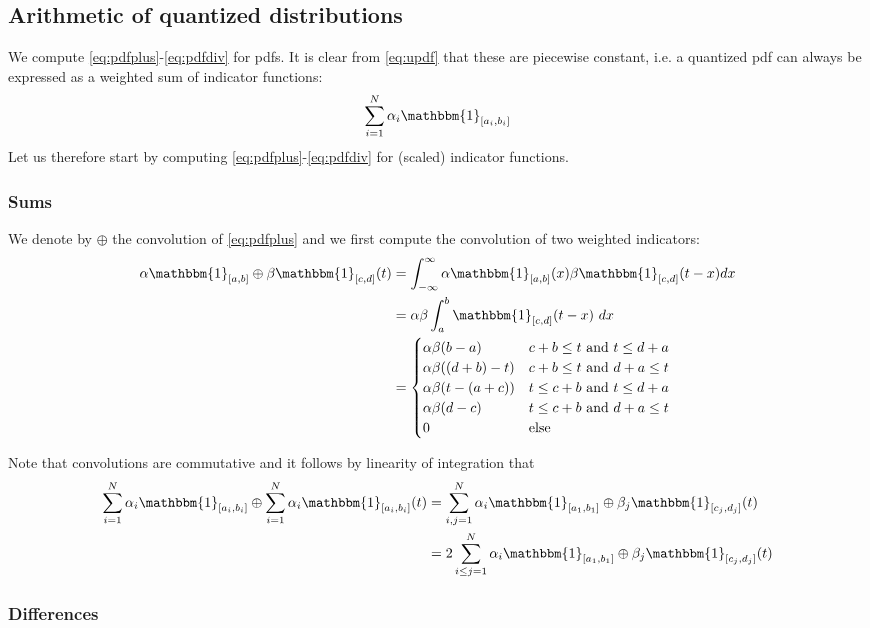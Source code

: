 \documentclass[10pt,a4paper]{article}
\theoremstyle{plain}
\theoremstyle{definition}
\newcommand{\one}{\mathbbm{1}}
\begin{document}
\subsection{Arithmetic of quantized distributions}

We compute \eqref{eq:pdfplus}-\eqref{eq:pdfdiv} for pdfs. It is clear from \eqref{eq:updf} that these are piecewise constant, i.e. a quantized pdf can always be expressed as a weighted sum of indicator functions:
\[
\sum_{i=1}^N \alpha_i \one_{\left[a_i,b_i\right]}
\]
Let us therefore start by computing \eqref{eq:pdfplus}-\eqref{eq:pdfdiv} for (scaled) indicator functions.

\subsubsection{Sums}
We denote by $\oplus$ the convolution of \eqref{eq:pdfplus} and we first compute the convolution of two weighted indicators:
\begin{align*}
\alpha\one_{[a,b]}\oplus\beta\one_{[c,d]}(t)& =\int_{-\infty}^\infty\alpha\one_{[a,b]}(x)\beta\one_{[c,d]}(t-x)dx \\
&=\alpha\beta\int_a^b \one_{[c,d]}(t-x)~dx\\
&= \begin{cases}
\alpha\beta(b-a)&c+b\leq t\text{ and }t\leq d+a\\
\alpha\beta((d+b)-t) & c+b\leq t\text{ and } d+a\leq t \\
\alpha\beta(t-(a+c)) & t\leq c+b\text{ and }t\leq d+a\\
\alpha\beta(d-c) & t\leq c+b\text{ and } d+a\leq t\\
0 &\text{else}
\end{cases}
\end{align*}

Note that convolutions are commutative and it follows by linearity of integration that
\begin{align*}
\sum_{i=1}^N \alpha_i \one_{\left[a_i,b_i\right]} \oplus \sum_{i=1}^N \alpha_i \one_{\left[a_i,b_i\right]}(t)&=\sum_{i,j=1}^N \alpha_i\one_{[a_1,b_1]}\oplus\beta_j\one_{[c_j,d_j]}(t) \\
&= 2\sum_{i\leq j=1}^N \alpha_i\one_{[a_1,b_1]}\oplus\beta_j\one_{[c_j,d_j]}(t)
\end{align*}


\subsubsection{Differences}
\end{document}
